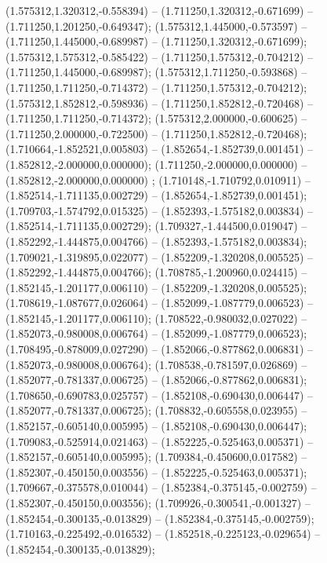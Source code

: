  (1.575312,1.320312,-0.558394) -- (1.711250,1.320312,-0.671699) -- (1.711250,1.201250,-0.649347);
 (1.575312,1.445000,-0.573597) -- (1.711250,1.445000,-0.689987) -- (1.711250,1.320312,-0.671699);
 (1.575312,1.575312,-0.585422) -- (1.711250,1.575312,-0.704212) -- (1.711250,1.445000,-0.689987);
 (1.575312,1.711250,-0.593868) -- (1.711250,1.711250,-0.714372) -- (1.711250,1.575312,-0.704212);
 (1.575312,1.852812,-0.598936) -- (1.711250,1.852812,-0.720468) -- (1.711250,1.711250,-0.714372);
 (1.575312,2.000000,-0.600625) -- (1.711250,2.000000,-0.722500) -- (1.711250,1.852812,-0.720468);
 (1.710664,-1.852521,0.005803) -- (1.852654,-1.852739,0.001451) -- (1.852812,-2.000000,0.000000);
 (1.711250,-2.000000,0.000000) -- (1.852812,-2.000000,0.000000) ;
 (1.710148,-1.710792,0.010911) -- (1.852514,-1.711135,0.002729) -- (1.852654,-1.852739,0.001451);
 (1.709703,-1.574792,0.015325) -- (1.852393,-1.575182,0.003834) -- (1.852514,-1.711135,0.002729);
 (1.709327,-1.444500,0.019047) -- (1.852292,-1.444875,0.004766) -- (1.852393,-1.575182,0.003834);
 (1.709021,-1.319895,0.022077) -- (1.852209,-1.320208,0.005525) -- (1.852292,-1.444875,0.004766);
 (1.708785,-1.200960,0.024415) -- (1.852145,-1.201177,0.006110) -- (1.852209,-1.320208,0.005525);
 (1.708619,-1.087677,0.026064) -- (1.852099,-1.087779,0.006523) -- (1.852145,-1.201177,0.006110);
 (1.708522,-0.980032,0.027022) -- (1.852073,-0.980008,0.006764) -- (1.852099,-1.087779,0.006523);
 (1.708495,-0.878009,0.027290) -- (1.852066,-0.877862,0.006831) -- (1.852073,-0.980008,0.006764);
 (1.708538,-0.781597,0.026869) -- (1.852077,-0.781337,0.006725) -- (1.852066,-0.877862,0.006831);
 (1.708650,-0.690783,0.025757) -- (1.852108,-0.690430,0.006447) -- (1.852077,-0.781337,0.006725);
 (1.708832,-0.605558,0.023955) -- (1.852157,-0.605140,0.005995) -- (1.852108,-0.690430,0.006447);
 (1.709083,-0.525914,0.021463) -- (1.852225,-0.525463,0.005371) -- (1.852157,-0.605140,0.005995);
 (1.709384,-0.450600,0.017582) -- (1.852307,-0.450150,0.003556) -- (1.852225,-0.525463,0.005371);
 (1.709667,-0.375578,0.010044) -- (1.852384,-0.375145,-0.002759) -- (1.852307,-0.450150,0.003556);
 (1.709926,-0.300541,-0.001327) -- (1.852454,-0.300135,-0.013829) -- (1.852384,-0.375145,-0.002759);
 (1.710163,-0.225492,-0.016532) -- (1.852518,-0.225123,-0.029654) -- (1.852454,-0.300135,-0.013829);
